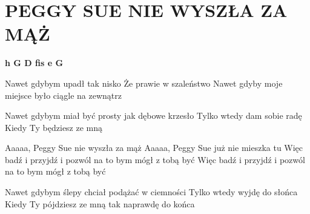 \documentclass[../../../songbook.tex]{subfiles}
\begin{document}
\TabPositions{9cm} %
\section*{PEGGY SUE NIE WYSZŁA ZA MĄŻ}
{}
\vspace{0.5cm}
{\color{red}\textbf{h G D fis e G} } \newline

Nawet gdybym upadł tak nisko	  \newline
Że prawie w szaleństwo	  \newline
Nawet gdyby moje miejsce było ciągle na zewnątrz	  \newline

Nawet gdybym miał być prosty jak dębowe krzesło \newline
Tylko wtedy dam sobie radę \newline
Kiedy Ty będziesz ze mną \newline

\TabPositions{11cm}  

\-\hspace{1cm} Aaaaa, Peggy Sue nie wyszła za mąż 				 \newline
\-\hspace{1cm} Aaaaa, Peggy Sue już nie mieszka tu					 \newline        
\-\hspace{1cm} Więc badź i przyjdź i pozwól na to bym mógł z tobą być				 \newline
\-\hspace{1cm} Więc badź i przyjdź i pozwól na to bym mógł z tobą być				 \newline

Nawet gdybym ślepy chciał podążać w ciemności \newline
Tylko wtedy wyjdę do słońca  \newline
Kiedy Ty pójdziesz ze mną tak naprawdę do końca \newline
\end{document}
